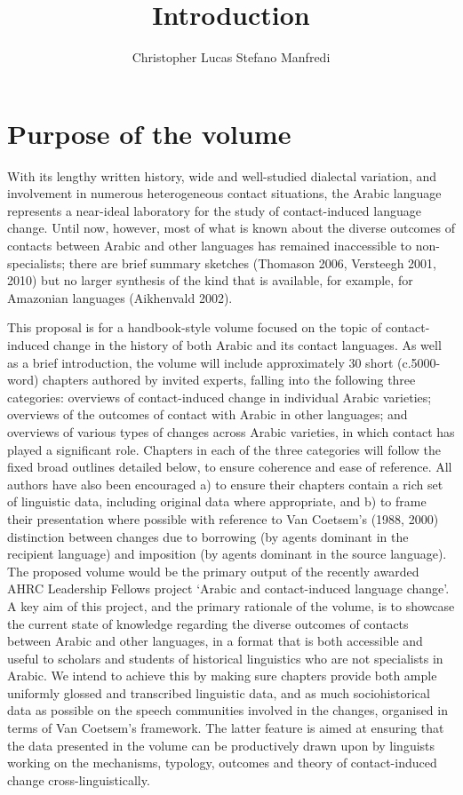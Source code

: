 \documentclass[output=paper]{langsci/langscibook}
\author{Christopher Lucas\affiliation{SOAS University of London}\lastand 
 Stefano Manfredi\affiliation{CNRS, SeDyL}
}
\title{Introduction}
\begin{document}
\section{Purpose of the volume}
With its lengthy written history, wide and well-studied dialectal variation, and involvement in numerous heterogeneous contact situations, the Arabic language represents a near-ideal laboratory for the study of contact-induced language change. Until now, however, most of what is known about the diverse outcomes of contacts between Arabic and other languages has remained inaccessible to non-specialists; there are brief summary sketches (Thomason 2006, Versteegh 2001, 2010) but no larger synthesis of the kind that is available, for example, for Amazonian languages (Aikhenvald 2002).

This proposal is for a handbook-style volume focused on the topic of contact-induced change in the history of both Arabic and its contact languages. As well as a brief introduction, the volume will include approximately 30 short (c.5000-word) chapters authored by invited experts, falling into the following three categories: overviews of contact-induced change in individual Arabic varieties; overviews of the outcomes of contact with Arabic in other languages; and overviews of various types of changes across Arabic varieties, in which contact has played a significant role.
Chapters in each of the three categories will follow the fixed broad outlines detailed below, to ensure coherence and ease of reference. All authors have also been encouraged a) to ensure their chapters contain a rich set of linguistic data, including original data where appropriate, and b) to frame their presentation where possible with reference to Van Coetsem’s (1988, 2000) distinction between changes due to borrowing (by agents dominant in the recipient language) and imposition (by agents dominant in the source language). 
The proposed volume would be the primary output of the recently awarded AHRC Leadership Fellows project ‘Arabic and contact-induced language change’. A key aim of this project, and the primary rationale of the volume, is to showcase the current state of knowledge regarding the diverse outcomes of contacts between Arabic and other languages, in a format that is both accessible and useful to scholars and students of historical linguistics who are not specialists in Arabic. We intend to achieve this by making sure chapters provide both ample uniformly glossed and transcribed linguistic data, and as much sociohistorical data as possible on the speech communities involved in the changes, organised in terms of Van Coetsem’s framework. The latter feature is aimed at ensuring that the data presented in the volume can be productively drawn upon by linguists working on the mechanisms, typology, outcomes and theory of contact-induced change cross-linguistically.
\end{document}
